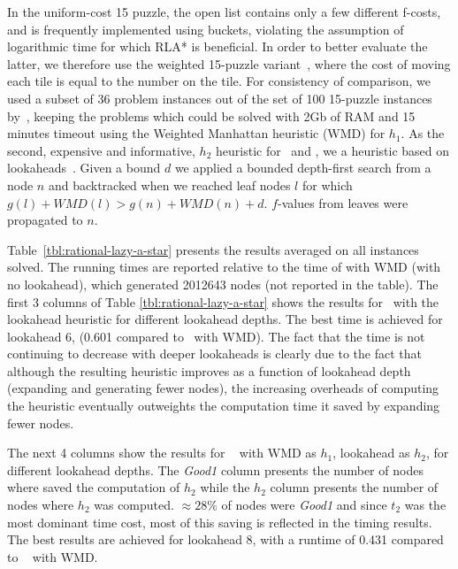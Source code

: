 In the uniform-cost 15 puzzle, the open list contains only a few different f-costs,
and is frequently implemented using buckets, violating the assumption of logarithmic time for which RLA* is beneficial. In order to
better evaluate the latter, we therefore use
the weighted 15-puzzle variant~\cite{thayer:bss}, where the
cost of moving each tile is equal to the number on the tile.  For consistency
of comparison, we used a subset of 36 problem instances out of the set of 100
15-puzzle instances by~\cite{BFID85}, keeping the problems which could
be solved with 2Gb of RAM and 15 minutes timeout using the Weighted Manhattan
heuristic (WMD) for $h_1$. As the second, expensive and informative, $h_2$ heuristic for \lazyastar~and \rationallazyastar, we a heuristic based
on lookaheads~\cite{DBLP:conf/aaai/SternKFH10}. Given a bound $d$ we applied a bounded depth-first search from a node $n$ and backtracked when we reached leaf nodes $l$ for which $g(l)+WMD(l)> g(n)+WMD(n)+d$. $f$-values from leaves were propagated to $n$.




Table~\ref{tbl:rational-lazy-a-star} presents the results averaged on all instances solved. The running times are reported relative to
the time of \astar with WMD (with no lookahead), which generated 2012643 nodes (not reported in the table). The first 3 columns of Table
\ref{tbl:rational-lazy-a-star} shows the results for \astar~with the lookahead
heuristic for different lookahead depths. The best time is achieved
for lookahead 6, (0.601 compared to \astar~with WMD). The fact that the time is not continuing to decrease with deeper lookaheads is clearly due to the fact that although the resulting heuristic improves as a function of lookahead depth (expanding and generating fewer nodes), the increasing overheads of computing the heuristic eventually outweights the computation time it saved by expanding fewer nodes.


The next 4 columns show the results for \lazyastar~
with WMD as $h_1$, lookahead as
$h_2$, for different lookahead depths.  The {\em Good1} column presents the number of nodes where \lazyastar saved the computation of $h_2$ while the $h_2$ column presents the number of nodes where $h_2$ was computed. $\approx 28\%$ of nodes were {\em Good1} and since $t_2$ was the most dominant time cost, most of this saving is reflected in the timing results.  The best results are achieved for lookahead 8, with a runtime of 0.431 compared to \astar~ with WMD.

